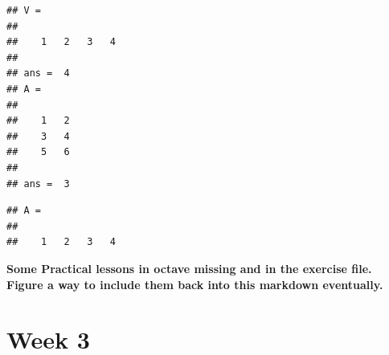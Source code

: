 \documentclass[
]{article}
\newenvironment{Shaded}{\begin{snugshade}}{\end{snugshade}}
\newcommand{\CommentTok}[1]{\textcolor[rgb]{0.56,0.35,0.01}{\textit{#1}}}
\newcommand{\FloatTok}[1]{\textcolor[rgb]{0.00,0.00,0.81}{#1}}
\newcommand{\NormalTok}[1]{#1}
\newcommand{\OperatorTok}[1]{\textcolor[rgb]{0.81,0.36,0.00}{\textbf{#1}}}
\begin{document}
\begin{verbatim}
## V =
## 
##    1   2   3   4
## 
## ans =  4
## A =
## 
##    1   2
##    3   4
##    5   6
## 
## ans =  3
\end{verbatim}

\begin{Shaded}
\begin{Highlighting}[]
\CommentTok{%
\CommentTok{%

\CommentTok{%
\CommentTok{%
\CommentTok{%

\CommentTok{%
\CommentTok{%
\end{Highlighting}
\end{Shaded}

\begin{Shaded}
\begin{Highlighting}[]
\CommentTok{%

\CommentTok{%

\CommentTok{%

\CommentTok{%
\CommentTok{%

\CommentTok{%
\CommentTok{%
\end{Highlighting}
\end{Shaded}

\begin{Shaded}
\end{Shaded}

\begin{verbatim}
## A =
## 
##    1   2   3   4
\end{verbatim}

\textbf{Some Practical lessons in octave missing and in the exercise
file. Figure a way to include them back into this markdown eventually.}

\hypertarget{week-3}{%
\section{Week 3}\label{week-3}}
\end{document}
